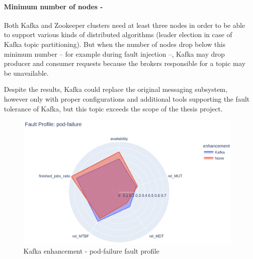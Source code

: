 \paragraph{Minimum number of nodes -}Both Kafka and Zookeeper clusters need at least three nodes in order to be able to support various kinds of distributed algorithms (\eg leader election in case of Kafka topic partitioning). But when the number of nodes drop below this minimum number -- for example during fault injection --, Kafka may drop producer and consumer requests because the brokers responsible for a topic may be unavailable.

Despite the results, Kafka could replace the original messaging subsystem, however only with proper configurations and additional tools supporting the fault tolerance of Kafka, but this topic exceeds the scope of the thesis project.

\begin{figure}[h]
	\centering
	\includegraphics[width=140mm, keepaspectratio]{figures/kafka_with_base_pod-failure.png}
	\caption{Kafka enhancement - pod-failure fault profile}
	\label{fig:kafka-results-pod-failure}
\end{figure}


